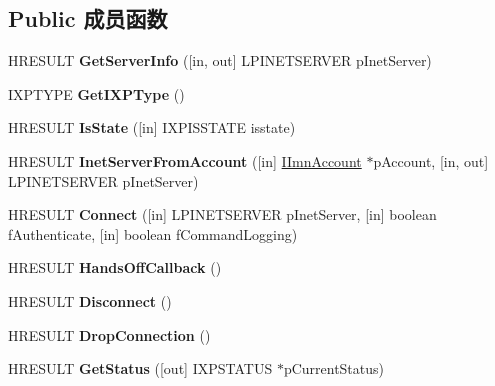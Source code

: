 \subsection*{Public 成员函数}
\begin{DoxyCompactItemize}
\item 
\mbox{\label{interface_i_internet_transport_a809c13082981143ce37e6f44f2801e27}} 
H\+R\+E\+S\+U\+LT {\bfseries Get\+Server\+Info} (\mbox{[}in, out\mbox{]} L\+P\+I\+N\+E\+T\+S\+E\+R\+V\+ER p\+Inet\+Server)
\item 
\mbox{\label{interface_i_internet_transport_a960f7ae41315bd15a704fbf365c74000}} 
I\+X\+P\+T\+Y\+PE {\bfseries Get\+I\+X\+P\+Type} ()
\item 
\mbox{\label{interface_i_internet_transport_a9885dc494b535eb84b8eff3ec109b50b}} 
H\+R\+E\+S\+U\+LT {\bfseries Is\+State} (\mbox{[}in\mbox{]} I\+X\+P\+I\+S\+S\+T\+A\+TE isstate)
\item 
\mbox{\label{interface_i_internet_transport_ad399729a99a9e1fffe93cc5fb541a179}} 
H\+R\+E\+S\+U\+LT {\bfseries Inet\+Server\+From\+Account} (\mbox{[}in\mbox{]} \hyperlink{interface_i_imn_account}{I\+Imn\+Account} $\ast$p\+Account, \mbox{[}in, out\mbox{]} L\+P\+I\+N\+E\+T\+S\+E\+R\+V\+ER p\+Inet\+Server)
\item 
\mbox{\label{interface_i_internet_transport_addac963f7f384cc14e2d289f02f359f4}} 
H\+R\+E\+S\+U\+LT {\bfseries Connect} (\mbox{[}in\mbox{]} L\+P\+I\+N\+E\+T\+S\+E\+R\+V\+ER p\+Inet\+Server, \mbox{[}in\mbox{]} boolean f\+Authenticate, \mbox{[}in\mbox{]} boolean f\+Command\+Logging)
\item 
\mbox{\label{interface_i_internet_transport_ae57755ff17f591671d2e63785e4e3714}} 
H\+R\+E\+S\+U\+LT {\bfseries Hands\+Off\+Callback} ()
\item 
\mbox{\label{interface_i_internet_transport_ab2ecd7debd58973c787b61bbcbea9770}} 
H\+R\+E\+S\+U\+LT {\bfseries Disconnect} ()
\item 
\mbox{\label{interface_i_internet_transport_a038ece0d4be9877547c6b5223cdfac59}} 
H\+R\+E\+S\+U\+LT {\bfseries Drop\+Connection} ()
\item 
\mbox{\label{interface_i_internet_transport_a07bbbdcaa0290bb8219cbe2ea7804f14}} 
H\+R\+E\+S\+U\+LT {\bfseries Get\+Status} (\mbox{[}out\mbox{]} I\+X\+P\+S\+T\+A\+T\+US $\ast$p\+Current\+Status)
\end{DoxyCompactItemize}
